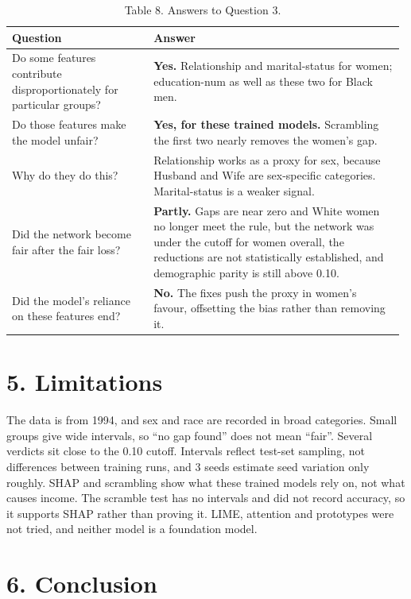 \documentclass[10pt,a4paper]{article}
\begin{document}
\begin{table}[H]
\centering\scriptsize
\setlength{\tabcolsep}{3pt}
\begin{tabular}{@{}>{\raggedright\arraybackslash}p{0.351\linewidth}>{\raggedright\arraybackslash}p{0.625\linewidth}@{}}
\toprule
\textbf{Question} & \textbf{Answer} \\
\midrule
Do some features contribute disproportionately for particular groups? & \textbf{Yes.} Relationship and marital-status for women; education-num as well as these two for Black men. \\
Do those features make the model unfair? & \textbf{Yes, for these trained models.} Scrambling the first two nearly removes the women's gap. \\
Why do they do this? & Relationship works as a proxy for sex, because Husband and Wife are sex-specific categories. Marital-status is a weaker signal. \\
Did the network become fair after the fair loss? & \textbf{Partly.} Gaps are near zero and White women no longer meet the rule, but the network was under the cutoff for women overall, the reductions are not statistically established, and demographic parity is still above 0.10. \\
Did the model's reliance on these features end? & \textbf{No.} The fixes push the proxy in women's favour, offsetting the bias rather than removing it. \\
\bottomrule
\end{tabular}
\caption*{Table 8. Answers to Question 3.}
\end{table}

\section*{5. Limitations}

The data is from 1994, and sex and race are recorded in broad categories. Small groups give wide intervals, so ``no gap found'' does not mean ``fair''. Several verdicts sit close to the 0.10 cutoff. Intervals reflect test-set sampling, not differences between training runs, and 3 seeds estimate seed variation only roughly. SHAP and scrambling show what these trained models rely on, not what causes income. The scramble test has no intervals and did not record accuracy, so it supports SHAP rather than proving it. LIME, attention and prototypes were not tried, and neither model is a foundation model.

\section*{6. Conclusion}
\end{document}
